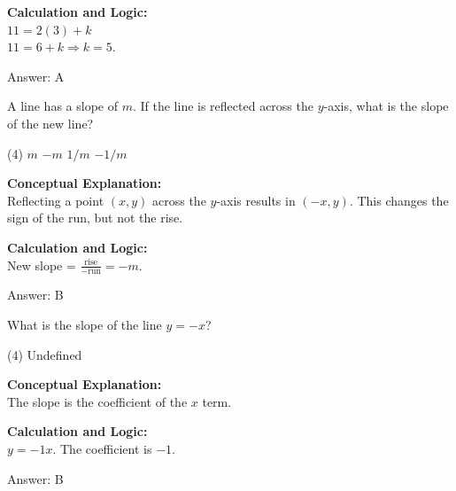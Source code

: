 \documentclass[11pt,paper=a4,answers]{exam}
\begin{document}
\begin{questions}
\begin{solution}
\vspace{10pt}
\textbf{Calculation and Logic:} \\
$11 = 2(3) + k$ \\
$11 = 6 + k \Rightarrow k = 5$.

\vspace{15pt}
Answer: \colorbox{yellow!100}{A}
\end{solution}

\vspace{20pt}

\question
A line has a slope of $m$. If the line is reflected across the $y$-axis, what is the slope of the new line?
\begin{tasks}(4)
    \task $m$
    \task $-m$
    \task $1/m$
    \task $-1/m$
\end{tasks}

\begin{solution}
\textbf{Conceptual Explanation:} \\
Reflecting a point $(x, y)$ across the $y$-axis results in $(-x, y)$. This changes the sign of the run, but not the rise.

\vspace{10pt}
\textbf{Calculation and Logic:} \\
New slope = $\frac{\text{rise}}{-\text{run}} = -m$.

\vspace{15pt}
Answer: \colorbox{yellow!100}{B}
\end{solution}

\vspace{20pt}

\question
What is the slope of the line $y = -x$?
\begin{tasks}(4)
    \task Undefined
\end{tasks}

\begin{solution}
\textbf{Conceptual Explanation:} \\
The slope is the coefficient of the $x$ term.

\vspace{10pt}
\textbf{Calculation and Logic:} \\
$y = -1x$. The coefficient is $-1$.

\vspace{15pt}
Answer: \colorbox{yellow!100}{B}
\end{solution}


\end{questions}
\end{document}
